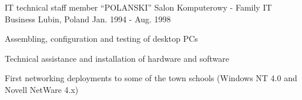 \begin{cventries}

\cventry
{IT technical staff member} %
{“POLANSKI” Salon Komputerowy - Family IT Business} %
{Lubin, Poland} %
{Jan. 1994 - Aug. 1998} %
{ %
\begin{cvitems}
\item {Assembling, configuration and testing of desktop PCs}
\item {Technical assistance and installation of hardware and software}
\item {First networking deployments to some of the town schools (Windows NT 4.0 and Novell NetWare 4.x)}
\end{cvitems}
}


\end{cventries}
